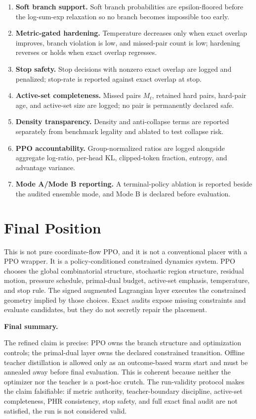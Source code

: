 \documentclass[11pt]{article}
\newcommand{\callout}[3]{%
\medskip\noindent\textbf{\textcolor{#1}{#2.}}\par\noindent #3\par\medskip
}
\begin{document}
\begin{enumerate}
    \item \textbf{Soft branch support.} Soft branch probabilities are epsilon-floored before the log-sum-exp relaxation so no branch becomes impossible too early.
    \item \textbf{Metric-gated hardening.} Temperature decreases only when exact overlap improves, branch violation is low, and missed-pair count is low; hardening reverses or holds when exact overlap regresses.
    \item \textbf{Stop safety.} Stop decisions with nonzero exact overlap are logged and penalized; stop-rate is reported against exact overlap at stop.
    \item \textbf{Active-set completeness.} Missed pairs $M_t$, retained hard pairs, hard-pair age, and active-set size are logged; no pair is permanently declared safe.
    \item \textbf{Density transparency.} Density and anti-collapse terms are reported separately from benchmark legality and ablated to test collapse risk.
    \item \textbf{PPO accountability.} Group-normalized ratios are logged alongside aggregate log-ratio, per-head KL, clipped-token fraction, entropy, and advantage variance.
    \item \textbf{Mode A/Mode B reporting.} A terminal-policy ablation is reported beside the audited ensemble mode, and Mode B is declared before evaluation.
\end{enumerate}

\section{Final Position}

This is not pure coordinate-flow PPO, and it is not a conventional placer with a PPO wrapper. It is a policy-conditioned constrained dynamics system. PPO chooses the global combinatorial structure, stochastic region structure, residual motion, pressure schedule, primal-dual budget, active-set emphasis, temperature, and stop rule. The signed augmented Lagrangian layer executes the constrained geometry implied by those choices. Exact audits expose missing constraints and evaluate candidates, but they do not secretly repair the placement.

\callout{purple!70!black}{Final summary}{The refined claim is precise: PPO owns the branch structure and optimization controls; the primal-dual layer owns the declared constrained transition. Offline teacher distillation is allowed only as an outcome-based warm start and must be annealed away before final evaluation. This is coherent because neither the optimizer nor the teacher is a post-hoc crutch. The run-validity protocol makes the claim falsifiable: if metric authority, teacher-boundary discipline, active-set completeness, PHR consistency, stop safety, and full exact final audit are not satisfied, the run is not considered valid.}
\end{document}
